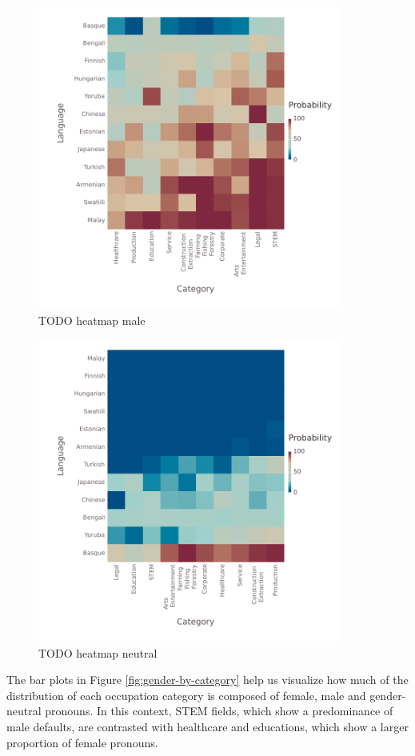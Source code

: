\documentclass[fleqn,10pt]{article}
\begin{document}
\begin{figure}[H]
	\centering
	\includegraphics[width=10cm]{pictures/heatmap-languages-categories-Male}
	\caption{TODO heatmap male}
	\label{fig:heatmap-male}
\end{figure}

\begin{figure}[H]
	\centering
	\includegraphics[width=10cm]{pictures/heatmap-languages-categories-Neutral}
	\caption{TODO heatmap neutral}
	\label{fig:heatmap-neutral}
\end{figure}



The bar plots in Figure \ref{fig:gender-by-category} help us visualize how much of the distribution of each occupation category is composed of female, male and gender-neutral pronouns. In this context, STEM fields, which show a predominance of male defaults, are contrasted with healthcare and educations, which show a larger proportion of female pronouns.
\end{document}
